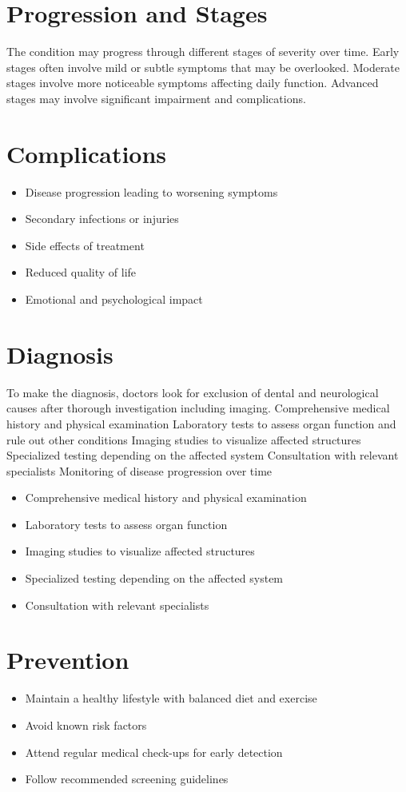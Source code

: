 \section{Progression and Stages}
The condition may progress through different stages of severity over time. Early stages often involve mild or subtle symptoms that may be overlooked. Moderate stages involve more noticeable symptoms affecting daily function. Advanced stages may involve significant impairment and complications.
\section{Complications}
\begin{itemize}[noitemsep]
  \item Disease progression leading to worsening symptoms
  \item Secondary infections or injuries
  \item Side effects of treatment
  \item Reduced quality of life
  \item Emotional and psychological impact
\end{itemize}
\section{Diagnosis}
To make the diagnosis, doctors look for exclusion of dental and neurological causes after thorough investigation including imaging. Comprehensive medical history and physical examination Laboratory tests to assess organ function and rule out other conditions Imaging studies to visualize affected structures Specialized testing depending on the affected system Consultation with relevant specialists Monitoring of disease progression over time

\begin{itemize}[noitemsep]
  \item Comprehensive medical history and physical examination
  \item Laboratory tests to assess organ function
  \item Imaging studies to visualize affected structures
  \item Specialized testing depending on the affected system
  \item Consultation with relevant specialists
\end{itemize}
\section{Prevention}
\begin{itemize}[noitemsep]
  \item Maintain a healthy lifestyle with balanced diet and exercise
  \item Avoid known risk factors
  \item Attend regular medical check-ups for early detection
  \item Follow recommended screening guidelines
\end{itemize}
